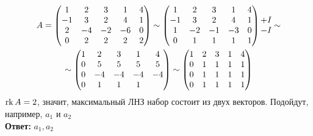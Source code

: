 \begin{multline*}
    A =
    \begin{pmatrix}
        1 & 2 & 3 & 1 & 4 \\
        -1 & 3 & 2 & 4 & 1 \\
        2 & -4 & -2 & -6 & 0 \\
        0 & 2 & 2 & 2 & 2
    \end{pmatrix} \sim
    \begin{pmatrix}
        1 & 2 & 3 & 1 & 4 \\
        -1 & 3 & 2 & 4 & 1 \\
        1 & -2 & -1 & -3 & 0 \\
        0 & 1 & 1 & 1 & 1
    \end{pmatrix}
    \begin{matrix}
        \ \\
        + \rom1 \\
        - \rom1 \\
        \
    \end{matrix} \sim \\
    \sim
    \begin{pmatrix}
        1 & 2 & 3 & 1 & 4 \\
        0 & 5 & 5 & 5 & 5 \\
        0 & -4 & -4 & -4 & -4 \\
        0 & 1 & 1 & 1
    \end{pmatrix} \sim
    \begin{pmatrix}
        1 & 2 & 3 & 1 & 4 \\
        0 & 1 & 1 & 1 & 1 \\
        0 & 1 & 1 & 1 & 1 \\
        0 & 1 & 1 & 1 & 1
    \end{pmatrix}
\end{multline*}
$ \operatorname{rk} A = 2 $, значит, максимальный ЛНЗ набор состоит из двух векторов. Подойдут, например, $ a_1 $ и $ a_2 $ \\
\textbf{Ответ:} $ a_1, a_2 $

